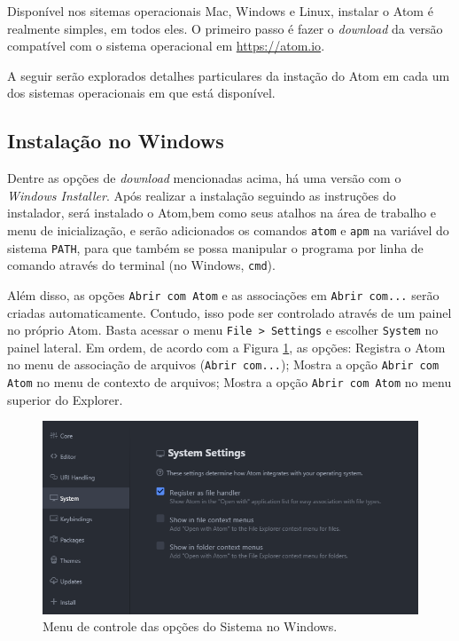 	Disponível nos sitemas operacionais Mac, Windows e Linux, instalar o Atom é realmente simples, em todos eles. O primeiro passo é fazer o \textit{download} da versão compatível com o sistema operacional em \href{https://atom.io}{https://atom.io}.

	A seguir serão explorados detalhes particulares da instação do Atom em cada um dos sistemas operacionais em que está disponível.

	\subsection{Instalação no Windows}\label{sec:instwin}
	Dentre as opções de \textit{download} mencionadas acima, há uma versão com o \textit{Windows Installer}. Após realizar a instalação seguindo as instruções do instalador, será instalado o Atom,bem como seus atalhos na área de trabalho e menu de inicialização, e serão adicionados os comandos \verb|atom| e \verb|apm| na variável do sistema \verb|PATH|, para que também se possa manipular o programa por linha de comando através do terminal (no Windows, \verb|cmd|).

	Além disso, as opções \verb|Abrir com Atom| e as associações em \verb|Abrir com...| serão criadas automaticamente. Contudo, isso pode ser controlado através de um painel no próprio Atom. Basta acessar o menu \verb|File > Settings| e escolher \verb|System| no painel lateral. Em ordem, de acordo com a Figura \ref{fig:fig1}, as opções: Registra o Atom no menu de associação de arquivos (\verb|Abrir com...|); Mostra a opção \verb|Abrir com Atom| no menu de contexto de arquivos; Mostra a opção \verb|Abrir com Atom| no menu superior do Explorer.

	\begin{figure}[h]
		\centering
		\label{fig:fig1}
		\includegraphics[scale = 0.7]{fig1}
		\caption{Menu de controle das opções do Sistema no Windows.}
	\end{figure}

